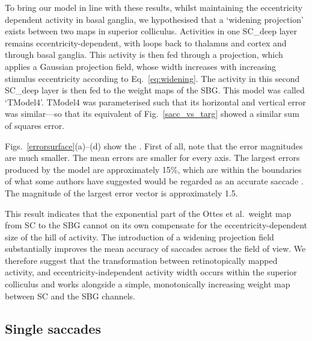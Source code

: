 \documentclass{frontiersSCNS}
\begin{document}
To bring our model in line with these results, whilst maintaining the
eccentricity dependent activity in basal ganglia, we hypothesised that
a `widening projection' exists between two maps in superior
colliculus.   Activities in one SC\_deep layer remains
eccentricity-dependent, with loops back to thalamus and cortex and
through basal ganglia.  This activity is then fed through a
projection, which applies a Gaussian projection field, whose width
increases with increasing stimulus eccentricity according to
Eq.~\ref{eq:widening}.  The activity in this second SC\_deep layer is
then fed to the weight maps of the SBG. This model was called
`TModel4'. TModel4 was parameterised such that its horizontal and
vertical error was similar---so that its equivalent of
Fig.~\ref{sacc_vs_targ} showed a similar sum of squares error.

Figs.~\ref{errorsurface}(a)--(d) show the .  First of
all, note that the error magnitudes are much smaller. The mean errors
are smaller for every axis. The largest errors produced by the model
are approximately 15\%, which are within the boundaries of what some
authors have suggested would be regarded as an accurate
saccade \citep{mcpeek_saccade_2002,mcpeek_incomplete_2006}.  The
magnitude of the largest error vector is approximately 1.5\dg.

This result indicates that the exponential part of the Ottes et
al.~weight map from SC to the SBG cannot on its own compensate for the
eccentricity-dependent size of the hill of activity. The introduction
of a widening projection field substantially improves the mean
accuracy of saccades across the field of view.  We therefore suggest
that the transformation between retinotopically mapped activity, and
eccentricity-independent activity width occurs within the superior
colliculus and works alongside a simple, monotonically increasing
weight map between SC and the SBG channels.

\subsection{Single saccades} \label{sec:results:singlesaccades}
\end{document}
